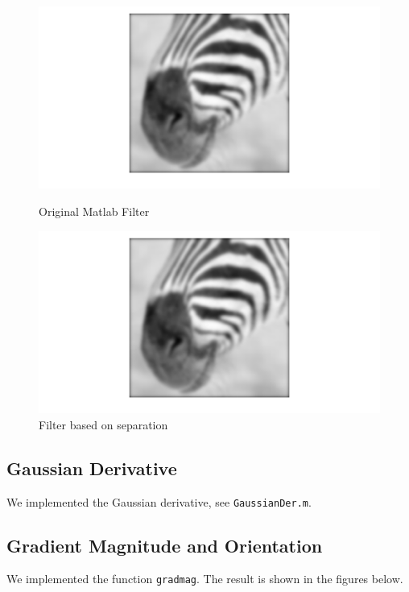 \documentclass[a4paper,10pt]{article}
\begin{document}
\begin{figure}[ht]
\begin{minipage}[b]{0.45\linewidth}
\centering
\includegraphics[width=\textwidth]{zebra_img/matlabfilter}
\caption{Original Matlab Filter}
\end{minipage}
\hspace{0.1cm}
\begin{minipage}[b]{0.45\linewidth}
\centering
\includegraphics[width=\textwidth]{zebra_img/separatedfilter}
\caption{Filter based on separation}
\end{minipage}
\end{figure}

\subsection{Gaussian Derivative}
We implemented the Gaussian derivative, see \verb+GaussianDer.m+.

\subsection{Gradient Magnitude and Orientation}
We implemented the function \verb+gradmag+. The result is shown in the figures below.
\end{document}
